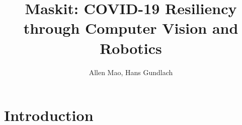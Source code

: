 \documentclass{article}
\title{Maskit: COVID-19 Resiliency through Computer Vision and Robotics}
\author{Allen Mao, Hans Gundlach}
\date{}
\begin{document}
\maketitle

\section{Introduction}
\end{document}
